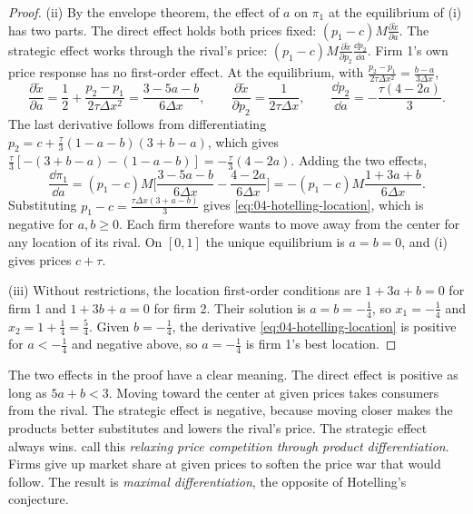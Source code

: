 \begin{proof}
(ii) By the envelope theorem, the effect of $a$ on $\pi_1$ at the equilibrium of (i) has two parts. The direct
effect holds both prices fixed: $(p_1 - c)M\frac{\partial\tilde x}{\partial a}$. The strategic effect works through
the rival's price: $(p_1 - c)M\frac{\partial\tilde x}{\partial p_2}\frac{\dd p_2}{\dd a}$. Firm 1's own price response
has no first-order effect. At the equilibrium, with $\frac{p_2 - p_1}{2\tau\Delta x^2} = \frac{b - a}{3\Delta x}$,
\begin{equation*}
\frac{\partial\tilde x}{\partial a} = \frac{1}{2} + \frac{p_2 - p_1}{2\tau\Delta x^2} = \frac{3 - 5a - b}{6\Delta x},
\qquad
\frac{\partial\tilde x}{\partial p_2} = \frac{1}{2\tau\Delta x},
\qquad
\frac{\dd p_2}{\dd a} = -\frac{\tau(4 - 2a)}{3}.
\end{equation*}
The last derivative follows from differentiating $p_2 = c + \frac{\tau}{3}(1 - a - b)(3 + b - a)$, which gives
$\frac{\tau}{3}[-(3 + b - a) - (1 - a - b)] = -\frac{\tau}{3}(4 - 2a)$. Adding the two effects,
\begin{equation*}
\frac{\dd\pi_1}{\dd a} = (p_1 - c)M\Big[\frac{3 - 5a - b}{6\Delta x} - \frac{4 - 2a}{6\Delta x}\Big]
= -(p_1 - c)M\frac{1 + 3a + b}{6\Delta x}.
\end{equation*}
Substituting $p_1 - c = \frac{\tau\Delta x(3 + a - b)}{3}$ gives \eqref{eq:04-hotelling-location}, which is negative
for $a, b \ge 0$. Each firm therefore wants to move away from the center for any location of its rival. On $[0,1]$
the unique equilibrium is $a = b = 0$, and (i) gives prices $c + \tau$.

(iii) Without restrictions, the location first-order conditions are $1 + 3a + b = 0$ for firm 1 and
$1 + 3b + a = 0$ for firm 2. Their solution is $a = b = -\frac{1}{4}$, so $x_1 = -\frac{1}{4}$ and
$x_2 = 1 + \frac{1}{4} = \frac{5}{4}$. Given $b = -\frac{1}{4}$, the derivative \eqref{eq:04-hotelling-location} is
positive for $a < -\frac{1}{4}$ and negative above, so $a = -\frac{1}{4}$ is firm 1's best location.
\end{proof}

The two effects in the proof have a clear meaning. The direct effect is positive as long as $5a + b < 3$. Moving
toward the center at given prices takes consumers from the rival. The strategic effect is negative, because moving
closer makes the products better substitutes and lowers the rival's price. The strategic effect always wins.
 call this \emph{relaxing price competition through product differentiation}. Firms give up
market share at given prices to soften the price war that would follow. The result is
\emph{maximal differentiation}, the opposite of Hotelling's conjecture.

